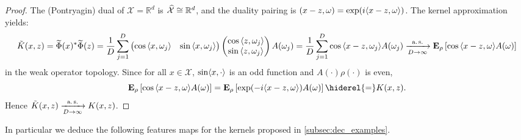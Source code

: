 \begin{proof}
The (Pontryagin) dual of $\mathcal{X}=\mathbb{R}^d$
is $\widehat{\mathcal{X}}\cong\mathbb{R}^d$, and the duality pairing is $(x-z,\omega)=\exp(i\langle x-z, \omega\rangle)$. The kernel approximation yields:
\begin{dmath*}
\tilde{K}(x,z)=\tildePhi{\omega}(x)^\adjoint \tildePhi{\omega}(z)
= \frac{1}{D} \sum_{j=1}^D \begin{pmatrix} \cos{\inner{x,\omega_j}} & \sin{\inner{x,\omega_j}} \end{pmatrix}\begin{pmatrix}\cos{\inner{z,\omega_j}} \\ \sin{\inner{z,\omega_j}} \end{pmatrix} A(\omega_j)
= \frac{1}{D} \sum_{j=1}^D \cos{\inner{x-z,\omega_j}}A(\omega_j) \\
\converges{\asurely}{D\to\infty}\expectation_\rho\left[\cos{\inner{x-z,\omega}}A(\omega)\right]
\end{dmath*}
in the weak operator topology. Since for all $x\in\mathcal{X}$, $\sin\langle x, \cdot\rangle$ is an odd function and $A(\cdot)\rho(\cdot)$ is even,
\begin{dmath*}
\expectation_\rho\left[\cos{\inner{x-z,\omega}}A(\omega)\right]=\expectation_\rho\left[\exp(-i\inner{x-z,\omega})A(\omega)\right]\hiderel{=}K(x,z).
\end{dmath*}
Hence $\tilde{K}(x,z)\xrightarrow[D\to\infty]{\text{a.\,s.}}K(x,z)$.
\end{proof}
In particular we deduce the following features maps for the kernels proposed in \cref{subsec:dec_examples}.
